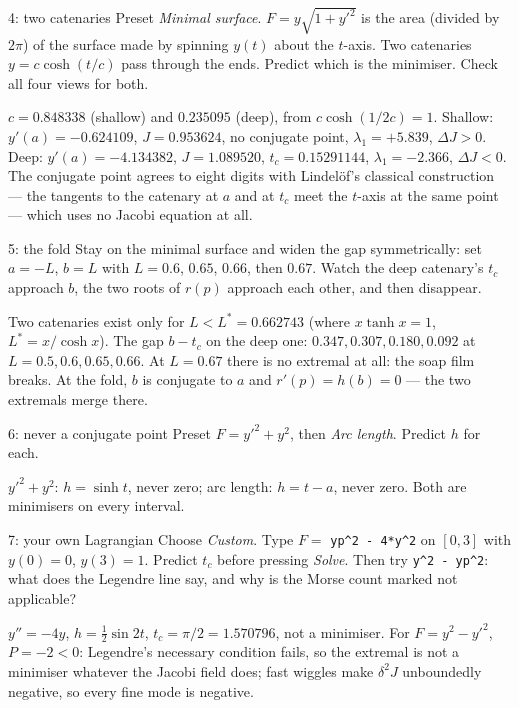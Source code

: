 \documentclass[11pt]{article}
\newcommand{\file}[1]{\texttt{#1}}
\begin{document}
\begin{expt}{4: two catenaries}
Preset \emph{Minimal surface}. $F = y\sqrt{1+y'^2}$ is the area (divided by $2\pi$)
of the surface made by spinning $y(t)$ about the $t$-axis. Two catenaries
$y = c\cosh(t/c)$ pass through the ends. Predict which is the minimiser. Check
all four views for both.
\begin{chk}
$c = 0.848338$ (shallow) and $0.235095$ (deep), from $c\cosh(1/2c) = 1$. Shallow:
$y'(a) = -0.624109$, $J = 0.953624$, no conjugate point, $\lambda_1 = +5.839$,
$\Delta J > 0$. Deep: $y'(a) = -4.134382$, $J = 1.089520$, $t_c = 0.15291144$,
$\lambda_1 = -2.366$, $\Delta J < 0$. The conjugate point agrees to eight digits
with Lindel\"of's classical construction --- the tangents to the catenary at $a$
and at $t_c$ meet the $t$-axis at the same point \cite{bliss} --- which uses no
Jacobi equation at all.
\end{chk}
\end{expt}

\begin{expt}{5: the fold}
Stay on the minimal surface and widen the gap symmetrically: set
$a = -L$, $b = L$ with $L = 0.6$, $0.65$, $0.66$, then $0.67$. Watch the deep
catenary's $t_c$ approach $b$, the two roots of $r(p)$ approach each other, and
then disappear.
\begin{chk}
Two catenaries exist only for $L < L^* = 0.662743$ (where $x\tanh x = 1$,
$L^* = x/\cosh x$). The gap $b - t_c$ on the deep one: $0.347, 0.307, 0.180, 0.092$
at $L = 0.5, 0.6, 0.65, 0.66$. At $L = 0.67$ there is no extremal at all: the
soap film breaks. At the fold, $b$ is conjugate to $a$ and $r'(p) = h(b) = 0$ ---
the two extremals merge there.
\end{chk}
\end{expt}

\begin{expt}{6: never a conjugate point}
Preset $F = y'^2 + y^2$, then \emph{Arc length}. Predict $h$ for each.
\begin{chk}
$y'^2 + y^2$: $h = \sinh t$, never zero; arc length: $h = t - a$, never zero.
Both are minimisers on every interval.
\end{chk}
\end{expt}

\begin{expt}{7: your own Lagrangian}
Choose \emph{Custom}. Type $F = $ \file{yp\^{}2 - 4*y\^{}2} on $[0, 3]$ with
$y(0) = 0$, $y(3) = 1$. Predict $t_c$ before pressing \emph{Solve}. Then try
\file{y\^{}2 - yp\^{}2}: what does the Legendre line say, and why is the Morse
count marked not applicable?
\begin{chk}
$y'' = -4y$, $h = \tfrac12\sin 2t$, $t_c = \pi/2 = 1.570796$, not a minimiser.
For $F = y^2 - y'^2$, $P = -2 < 0$: Legendre's necessary condition fails, so the
extremal is not a minimiser whatever the Jacobi field does; fast wiggles make
$\delta^2 J$ unboundedly negative, so every fine mode is negative.
\end{chk}
\end{expt}
\end{document}
